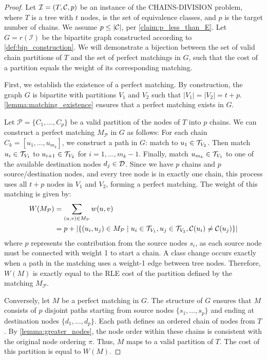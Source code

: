 \begin{proof}
    Let $\mathcal{I} = (T, \mathcal{C}, p)$ be an instance of the \textsc{CHAINS-DIVISION} problem, where $T$ is a tree with $t$ nodes, \equivsetmath is the set of equivalence classes, and $p$ is the target number of chains. We assume $p \leq |\mathcal{C}|$, per \cref{claim:p_less_than_E}. Let $G = r(\mathcal{I})$ be the bipartite graph constructed according to \cref{def:bip_construction}. We will demonstrate a bijection between the set of valid chain partitions of $T$ and the set of perfect matchings in $G$, such that the cost of a partition equals the weight of its corresponding matching.

    First, we establish the existence of a perfect matching. By construction, the graph $G$ is bipartite with partitions $V_1$ and $V_2$ such that $|V_1| = |V_2| = t+p$. \cref{lemma:matching_existence} ensures that a perfect matching exists in $G$.

    Let $\mathcal{P} = \{C_1, \dots, C_p\}$ be a valid partition of the nodes of $T$ into $p$ chains. We can construct a perfect matching $M_\mathcal{P}$ in $G$ as follows:  For each chain $C_k = [u_{1}, \dots, u_{m_k}]$, we construct a path in $G$: match  to $u_{1} \in \mathcal{T}_{V_2}$. Then match $u_{i} \in \mathcal{T}_{V_1}$ to $u_{i+1} \in \mathcal{T}_{V_2}$ for $i=1, \dots, m_k-1$. Finally, match $u_{m_k} \in \mathcal{T}_{V_1}$ to one of the available destination nodes $d_j \in \mathcal{D}$. Since we have $p$ chains and $p$ source/destination nodes, and every tree node is in exactly one chain, this process uses all $t+p$ nodes in $V_1$ and $V_2$, forming a perfect matching. The weight of this matching is given by:
    \begin{align*}
        W(M_\mathcal{P}) &= \sum_{(u,v) \in M_\mathcal{P}} w(u,v) \\
        &= p + |\{ (u_i, u_j) \in M_\mathcal{P} \mid u_i \in \mathcal{T}_{V_1}, u_j \in \mathcal{T}_{V_2}, \mathcal{C}(u_i) \neq \mathcal{C}(u_j) \}|
    \end{align*}
    where $p$ represents the contribution from the source nodes $s_i$, as each source node must be connected with weight 1 to start a chain. A class change occurs exactly when a path in the matching uses a weight-1 edge between tree nodes.
    Therefore, $W(M)$ is exactly equal to the RLE cost of the partition defined by the matching $M_\mathcal{P}$.

    Conversely, let $M$ be a perfect matching in $G$. The structure of $G$ ensures that $M$ consists of $p$ disjoint paths starting from source nodes $\{s_1, \dots, s_p\}$ and ending at destination nodes $\{d_1, \dots, d_p\}$. Each path defines an ordered chain of nodes from $T$. By \cref{lemma:greater_nodes}, the node order within these chains is consistent with the original node ordering $\pi$. Thus, $M$ maps to a valid partition of $T$. The cost of this partition is equal to $W(M)$.


\end{proof}
